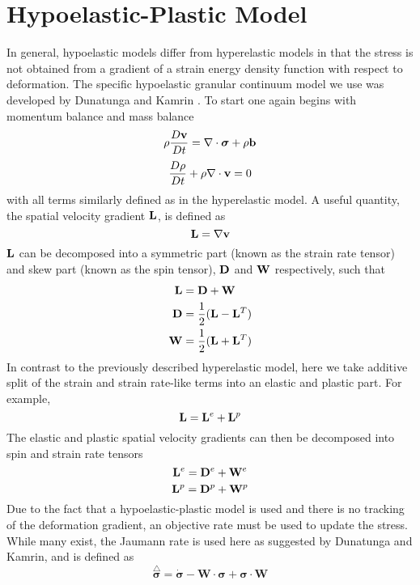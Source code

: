 \section{Hypoelastic-Plastic Model} \label{hypoelastic_model}
In general, hypoelastic models differ from hyperelastic models in that the stress is not obtained from a gradient of a strain energy density function with respect to deformation. The specific hypoelastic granular continuum model we use was developed by Dunatunga and Kamrin \cite{Dunatunga:2015:Continuum}. To start one again begins with momentum balance and mass balance
\begin{equation}
\rho\frac{D\bold{v}}{Dt} = \nabla\cdot\bm{\sigma} + \rho\bold{b} \label{mom_bal}
\end{equation}
\begin{equation}
\frac{D\rho}{Dt} + \rho\nabla\cdot\bold{v}=0\label{mass_bal}
\end{equation}
with all terms similarly defined as in the hyperelastic model. A useful quantity, the spatial velocity gradient $\bold{L}$, is defined as
\begin{equation}
\bold{L}=\nabla\bold{v} \label{L_def}
\end{equation}
$\bold{L}$ can be decomposed into a symmetric part (known as the strain rate tensor) and skew part (known as the spin tensor), $\bold{D}$ and $\bold{W}$ respectively, such that
\begin{subequations}
\begin{align}
\bold{L}&=\bold{D}+\bold{W} \label{L_split} \\
\bold{D}&=\frac{1}{2}(\bold{L}-\bold{L}^T) \label{D_def} \\
\bold{W}&=\frac{1}{2}(\bold{L}+\bold{L}^T) \label{W_def}
\end{align}
\end{subequations}
In contrast to the previously described hyperelastic model, here we take additive split of the strain and strain rate-like terms into an elastic and plastic part. For example,
$$\bold{L}=\bold{L}^e+\bold{L}^p$$
The elastic and plastic spatial velocity gradients can then be decomposed into spin and strain rate tensors
$$\bold{L}^e=\bold{D}^e+\bold{W}^e$$
$$\bold{L}^p=\bold{D}^p+\bold{W}^p$$
Due to the fact that a hypoelastic-plastic  model is used and there is no tracking of the deformation gradient, an objective rate must be used to update the stress. While many exist, the Jaumann rate is used here as suggested by Dunatunga and Kamrin, and is defined as
\begin{equation}
\stackrel{\triangle}{\bm{\sigma}}=\dot{\bm{\sigma}}-\bm{W}\cdot\bm{\sigma}+\bm{\sigma}\cdot\bm{W}\label{Jaumann_rate}
\end{equation}
